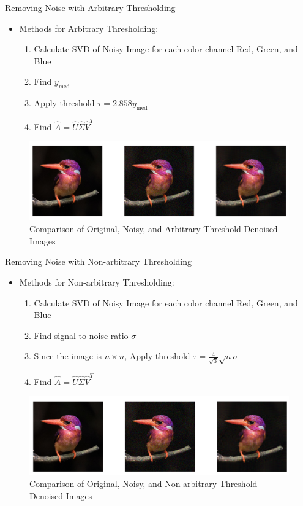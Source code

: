 \documentclass[aspectratio=169,xcolor=dvipsnames]{beamer}
\begin{document}
	\begin{frame}{Removing Noise with Arbitrary Thresholding}
		\begin{itemize}
			\item Methods for Arbitrary Thresholding: 
			\begin{enumerate}
				\item Calculate SVD of Noisy Image for each color channel Red, Green, and Blue
				\item Find $y_{\text{med}}$
				\item Apply threshold $\tau = 2.858y_{\text{med}}$
				\item Find $\hat{A} = \hat{U}\hat{\Sigma}\hat{V}^T$
			\end{enumerate}
		\end{itemize}
		\begin{figure}
		\includegraphics[scale=0.4]{ArbitraryDenoise.png}
		\caption{Comparison of Original, Noisy, and Arbitrary Threshold Denoised Images}
		\end{figure}
	\end{frame}
	
	
	\begin{frame}{Removing Noise with Non-arbitrary Thresholding}
		\begin{itemize}
			\item Methods for Non-arbitrary Thresholding: 
			\begin{enumerate}
				\item Calculate SVD of Noisy Image for each color channel Red, Green, and Blue
				\item Find signal to noise ratio $\sigma$
				\item Since the image is $n\times n$, Apply threshold $\tau = \frac{4}{\sqrt{3}}\sqrt{n}\sigma$
				\item Find $\hat{A} = \hat{U}\hat{\Sigma}\hat{V}^T$
			\end{enumerate}
		\end{itemize}
		\begin{figure}
			\includegraphics[scale=0.4]{SquareDenoise.png}
			\caption{Comparison of Original, Noisy, and Non-arbitrary Threshold Denoised Images}
		\end{figure}
	\end{frame}
	
\end{document}
